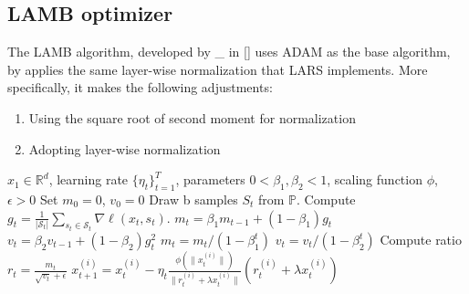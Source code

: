 \subsection*{LAMB optimizer}
The LAMB algorithm, developed by \_ in [] uses ADAM as the base algorithm, by applies the same layer-wise normalization that LARS implements. More specifically, it makes the following adjustments:
\begin{enumerate}
    \item Using the square root of second moment for normalization
    \item Adopting layer-wise normalization
\end{enumerate}
\begin{minipage}[b]{.5\textwidth}
\begin{algorithm}[H]\small
	\caption{$LAMB$}
	\label{alg:lamb}
	\begin{algorithmic}
		 $x_1 \in \mathbb{R}^d$, learning rate $\{\eta_t\}_{t=1}^T$,  parameters $0 < \beta_{1}, \beta_2 < 1$, scaling function $\phi$, $\epsilon > 0$
		\STATE Set $m_{0} = 0$, $v_{0} = 0$
		\STATE Draw b samples $S_t$ from $\mathbb{P}$.
        \STATE Compute $g_t = \frac{1}{|\mathcal{S}_t|} \sum_{s_t \in \mathcal{S}_t}\nabla \ell(x_t, s_t)$.
		\STATE  $m_{t} = \beta_{1} m_{t-1} + (1 - \beta_{1}) g_{t}$ 
		\STATE  $v_{t} = \beta_{2} v_{t-1} + (1 - \beta_{2}) g_{t}^2$
		\STATE $m_t = m_t/(1 - {\beta}_1^t)$ 
        \STATE $v_t = v_t/(1 - {\beta}_2^t)$
		\STATE Compute ratio $r_t = \frac{m_t}{\sqrt{v_t} + \epsilon}$
		\STATE $x_{t+1}^{(i)} = x_{t}^{(i)} - \eta_t \frac{\phi(\|x_t^{(i)}\|)}{\|r_t^{(i)} + \lambda x_t^{(i)}\|} (r_t^{(i)} + \lambda x_t^{(i)})$
		\ENDFOR
	\end{algorithmic}
\end{algorithm}
\end{minipage}



